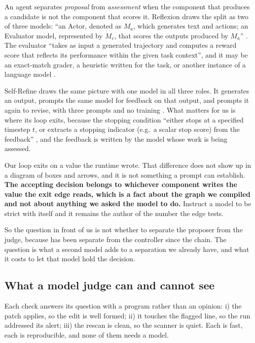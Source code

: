 \begin{definition}
\label{def:actor-evaluator}
An agent separates \emph{proposal} from \emph{assessment} when the component that produces a candidate is not the component that scores it. Reflexion draws the split as two of three models: ``an Actor, denoted as $M_a$, which generates text and actions; an Evaluator model, represented by $M_e$, that scores the outputs produced by $M_a$'' \citep[\S3]{shinn2023reflexion}. The evaluator ``takes as input a generated trajectory and computes a reward score that reflects its performance within the given task context'', and it may be an exact-match grader, a heuristic written for the task, or another instance of a language model \citep[\S3]{shinn2023reflexion}.
\end{definition}

Self-Refine draws the same picture with one model in all three roles. It generates an output,
prompts the same model for feedback on that output, and prompts it again to revise, with three
prompts and no training \citep[\S2]{madaan2023selfrefine}. What matters for us is where its loop
exits, because the stopping condition ``either stops at a specified timestep $t$, or extracts a
stopping indicator (e.g.\ a scalar stop score) from the feedback''
\citep[\S2]{madaan2023selfrefine}, and the feedback is written by the model whose work is being
assessed.

Our loop exits on a value the runtime wrote. That difference does not show up in a diagram of boxes
and arrows, and it is not something a prompt can establish. \textbf{The accepting decision belongs
to whichever component writes the value the exit edge reads, which is a fact about the graph we
compiled and not about anything we asked the model to do.} Instruct a model to be strict with itself
and it remains the author of the number the edge tests.

So the question in front of us is not whether to separate the proposer from the judge, because
 has been separate from the controller since the chain. The question is what a
second model adds to a separation we already have, and what it costs to let that model hold the
decision.

\subsection{What a model judge can and cannot see}
\label{sec:validation-judge}

Each check answers its question with a program rather than an opinion: i) the patch applies, so the
edit is well formed; ii) it touches the flagged line, so the run addressed its alert; iii) the
rescan is clean, so the scanner is quiet. Each is fast, each is reproducible,
and none of them needs a model.

